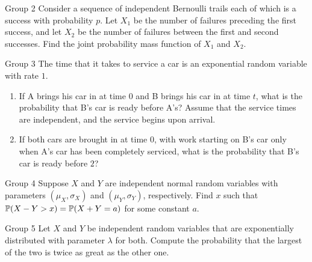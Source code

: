 \documentclass{article}
\begin{document}
\begin{problem}
    {Group 2}
    Consider a sequence of independent Bernoulli trails each of which is a success with probability $p$. Let $X_1$ be the number of failures preceding the first success, and let $X_2$ be the number of failures between the first and second successes. Find the joint probability mass function of $X_1$ and $X_2$.
\end{problem}

\begin{problem}
    {Group 3}
    The time that it takes to service a car is an exponential random variable with rate $1$.
    \begin{enumerate}
        \item If A brings his car in at time $0$ and B brings his car in at time $t$, what is the probability that B's car is ready before A's? Assume that the service times are independent, and the service begins upon arrival.
        \item If both cars are brought in at time $0$, with work starting on B's car only when A's car has been completely serviced, what is the probability that B's car is ready before $2$?
    \end{enumerate}
\end{problem}

\begin{problem}
    {Group 4}
    Suppose $X$ and $Y$ are independent normal random variables with parameters $(\mu_X,\sigma_X)$ and $(\mu_Y, \sigma_Y)$, respectively. Find $x$ such that $\P{X-Y>x}=\P{X+Y=a}$ for some constant $a$.
\end{problem}

\begin{problem}
    {Group 5}
    Let $X$ and $Y$ be independent random variables that are exponentially distributed with parameter $\lambda$ for both. Compute the probability that the largest of the two is twice as great as the other one.
\end{problem}
\fi
\end{document}
